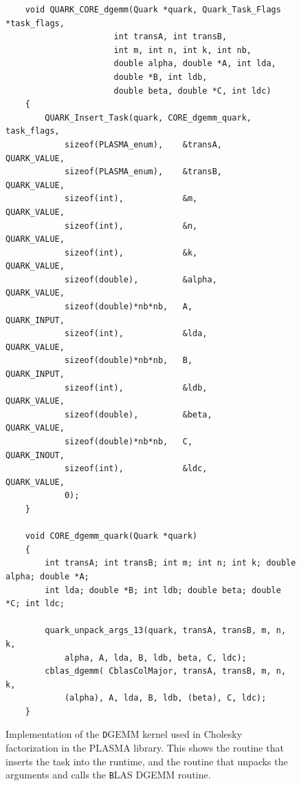 \documentclass[11pt,letterpaper]{report}
\begin{document}
\begin{figure}[pbt]
\centering
\scriptsize
\begin{lstlisting}
    void QUARK_CORE_dgemm(Quark *quark, Quark_Task_Flags *task_flags,
                      int transA, int transB,
                      int m, int n, int k, int nb,
                      double alpha, double *A, int lda,
                      double *B, int ldb,
                      double beta, double *C, int ldc)
    {
        QUARK_Insert_Task(quark, CORE_dgemm_quark, task_flags,
            sizeof(PLASMA_enum),    &transA,    QUARK_VALUE,
            sizeof(PLASMA_enum),    &transB,    QUARK_VALUE,
            sizeof(int),            &m,         QUARK_VALUE,
            sizeof(int),            &n,         QUARK_VALUE,
            sizeof(int),            &k,         QUARK_VALUE,
            sizeof(double),         &alpha,     QUARK_VALUE,
            sizeof(double)*nb*nb,   A,          QUARK_INPUT,
            sizeof(int),            &lda,       QUARK_VALUE,
            sizeof(double)*nb*nb,   B,          QUARK_INPUT,
            sizeof(int),            &ldb,       QUARK_VALUE,
            sizeof(double),         &beta,      QUARK_VALUE,
            sizeof(double)*nb*nb,   C,          QUARK_INOUT,
            sizeof(int),            &ldc,       QUARK_VALUE,
            0);
    }

    void CORE_dgemm_quark(Quark *quark)
    {
        int transA; int transB; int m; int n; int k; double alpha; double *A;
        int lda; double *B; int ldb; double beta; double *C; int ldc;

        quark_unpack_args_13(quark, transA, transB, m, n, k,
            alpha, A, lda, B, ldb, beta, C, ldc);
        cblas_dgemm( CblasColMajor, transA, transB, m, n, k,
            (alpha), A, lda, B, ldb, (beta), C, ldc);
    }
\end{lstlisting}
\caption{ Implementation of the {\texttt DGEMM} kernel used in
  Cholesky factorization in the PLASMA library.  This shows the
  routine that inserts the task into the runtime, and the routine that
  unpacks the arguments and calls the {\texttt BLAS DGEMM} routine. }
\label{fig:quark_core_dgemm}
\end{figure}








\end{document}
